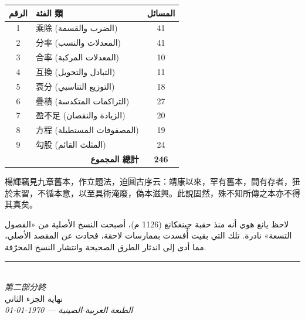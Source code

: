 \documentclass[11pt,a4paper]{article}
\newcommand{\longline}{\noindent\rule{\textwidth}{0.4pt}}
\newcommand{\ChinCol}[1]{\begin{minipage}[t]{0.48\textwidth}#1\end{minipage}}
\newcommand{\ArabCol}[1]{\begin{minipage}[t]{0.48\textwidth}\arabicfont\beginR #1\endR\end{minipage}}
\newcommand{\parallelsection}[2]{%
  \noindent\ChinCol{#1}\hfill\ArabCol{#2}\par\vspace{0.5cm}%
}
\begin{document}
\begin{center}
\begin{longtable}{|c|l|c|}
\hline
\textbf{الرقم} & \textbf{الفئة 類} & \textbf{المسائل} \\
\hline
1 & 乘除 (الضرب والقسمة) & 41 \\
2 & 分率 (المعدلات والنسب) & 41 \\
3 & 合率 (المعدلات المركبة) & 10 \\
4 & 互換 (التبادل والتحويل) & 11 \\
5 & 衰分 (التوزيع التناسبي) & 18 \\
6 & 疊積 (التراكمات المتكدسة) & 27 \\
7 & 盈不足 (الزيادة والنقصان) & 20 \\
8 & 方程 (المصفوفات المستطيلة) & 19 \\
9 & 勾股 (المثلث القائم) & 24 \\
\hline
\multicolumn{2}{|r|}{\textbf{المجموع 總計}} & \textbf{246} \\
\hline
\end{longtable}
\end{center}

\vspace{1cm}

\parallelsection{%
楊輝竊見九章舊本，作立題法，迫圓古序云：靖康以來，罕有舊本，間有存者，狃於末習，不循本意，以至具術淹廢，偽本滋興。此說固然，殊不知所傳之本亦不得其真矣。%
}{%
لاحظ يانغ هوي أنه منذ حقبة جينغكانغ (1126 م)، أصبحت النسخ الأصلية من «الفصول التسعة» نادرة. تلك التي بقيت أُفسدت بممارسات لاحقة، فحادت عن المقصد الأصلي، مما أدى إلى اندثار الطرق الصحيحة وانتشار النسخ المحرّفة.%
}

\vspace{2cm}
\begin{center}
\longline\\[0.5cm]
{\small\textit{第二部分終}}\\[0.3cm]
{\small\arabicfont\beginR نهاية الجزء الثاني\endR}\\[0.3cm]
{\footnotesize\textit{الطبعة العربية-الصينية --- \today}}
\end{center}
\end{document}
